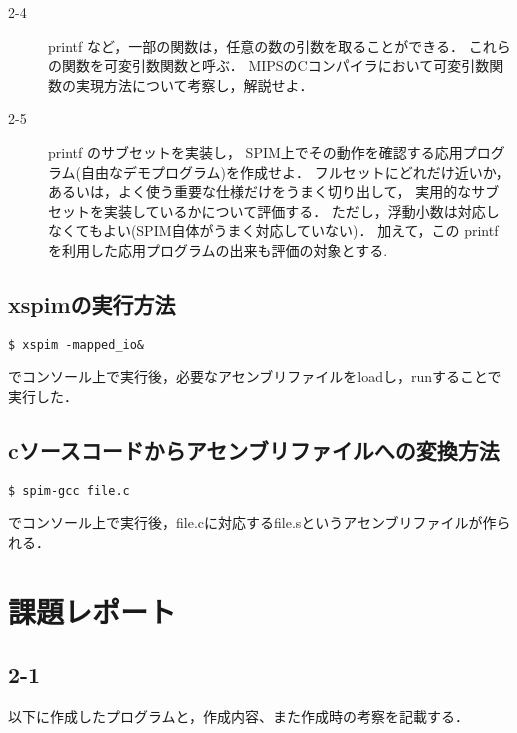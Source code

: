 \documentclass[a4j,11pt]{jarticle}
\begin{document}
\begin{description}
\item[2-4]printf など，一部の関数は，任意の数の引数を取ることができる． これらの関数を可変引数関数と呼ぶ． MIPSのCコンパイラにおいて可変引数関数の実現方法について考察し，解説せよ．

\item[2-5]printf のサブセットを実装し， SPIM上でその動作を確認する応用プログラム(自由なデモプログラム)を作成せよ． フルセットにどれだけ近いか，あるいは，よく使う重要な仕様だけをうまく切り出して， 実用的なサブセットを実装しているかについて評価する． ただし，浮動小数は対応しなくてもよい(SPIM自体がうまく対応していない)． 加えて，この printf を利用した応用プログラムの出来も評価の対象とする.

\end{description}
\subsection{xspimの実行方法}
\begin{verbatim}
$ xspim -mapped_io&
\end{verbatim}
でコンソール上で実行後，必要なアセンブリファイルをloadし，runすることで実行した．

\subsection{cソースコードからアセンブリファイルへの変換方法} 
\begin{verbatim}
$ spim-gcc file.c
\end{verbatim}
でコンソール上で実行後，file.cに対応するfile.sというアセンブリファイルが作られる．
\section{課題レポート}

 \subsection{2-1}
以下に作成したプログラムと，作成内容、また作成時の考察を記載する．
\end{document}
